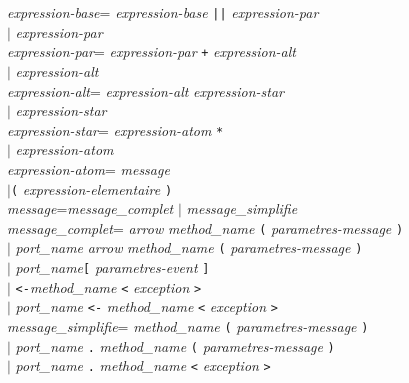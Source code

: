 \begin{tabbing}
\emph{expression-base}\>\twocol=\> \emph{expression-base} \verb+||+ \emph{expression-par} \\
    \>$\mid$\> \emph{expression-par} \\

\emph{expression-par}\>\twocol=\>  \emph{expression-par} \verb|+| \emph{expression-alt} \\
    \>$\mid$\> \emph{expression-alt}\\

\emph{expression-alt}\>\twocol=\>  \emph{expression-alt} \emph{expression-star} \\
    \>$\mid$\> \emph{expression-star} \\

\emph{expression-star}\>\twocol=\>  \emph{expression-atom} \texttt{*} \\
    \>$\mid$\> \emph{expression-atom} \\


\emph{expression-atom}\>\twocol=\> \emph{message} \\ 
    \>$\mid$\>\texttt{(} \emph{expression-elementaire} \texttt{)}\\

\emph{message}\>\twocol=\>\emph{message\_complet} $\mid$
\emph{message\_simplifie}\\

\emph{message\_complet}\>\twocol=\> \emph{arrow} \emph{method\_name}
\texttt{(} \emph{parametres-message} \texttt{)}  \\
    \>$\mid$\> \emph{port\_name} \emph{arrow} \emph{method\_name} \texttt{(} \emph{parametres-message} \texttt{)}  \\  
    \>$\mid$\> \emph{port\_name}\texttt{[} \emph{parametres-event} \texttt{]}  \\
    \>$\mid$\> \texttt{<-}\emph{method\_name} \texttt{<} \emph{exception} \texttt{>}\\
    \>$\mid$\> \emph{port\_name} \texttt{<-} \emph{method\_name}
    \texttt{<} \emph{exception} \texttt{>}\\

\emph{message\_simplifie}\>\twocol=\> \emph{method\_name} \texttt{(} \emph{parametres-message} \texttt{)}  \\
    \>$\mid$\> \emph{port\_name} \texttt{.} \emph{method\_name} \texttt{(} \emph{parametres-message} \texttt{)}  \\
    \>$\mid$\> \emph{port\_name} \texttt{.} \emph{method\_name}
    \texttt{<} \emph{exception} \texttt{>}\\


\end{tabbing}
